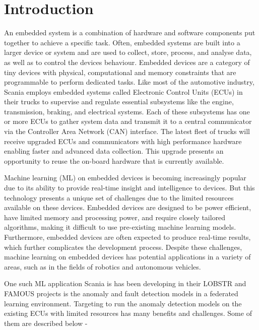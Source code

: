 \part{Introduction}

An embedded system is a combination of hardware and software components put together to achieve a specific task. Often, embedded systems are built into a larger device or system and are used to collect, store, process, and analyse data, as well as to control the device\textquotesingle s behaviour. Embedded devices are a category of tiny devices with physical, computational and memory constraints that are programmable to perform dedicated tasks.   
Like most of the automotive industry, Scania employs embedded systems called Electronic Control Units (ECUs) in their trucks to supervise and regulate essential subsystems like the engine, transmission, braking, and electrical systems. Each of these subsystems has one or more ECUs to gather system data and transmit it to a central communicator via the Controller Area Network (CAN) interface. The latest fleet of trucks will receive upgraded ECUs and communicators with high performance hardware enabling faster and advanced data collection. This upgrade presents an opportunity to reuse the on-board hardware that is currently available.

Machine learning (ML) on embedded devices is becoming increasingly popular due to its ability to provide real-time insight and intelligence to devices. But this technology presents a unique set of challenges due to the limited resources available on these devices. Embedded devices are designed to be power efficient, have limited memory and processing power, and require closely tailored algorithms, making it difficult to use pre-existing machine learning models. Furthermore, embedded devices are often expected to produce real-time results, which further complicates the development process. Despite these challenges, machine learning on embedded devices has potential applications in a variety of areas, such as in the fields of robotics and autonomous vehicles. %

One such ML application Scania is has been developing in their \textsc{LOBSTR} and \textsc{FAMOUS} projects is the anomaly and fault detection models in a federated learning environment. Targeting to run the anomaly detection models on the existing ECUs with limited resources has many benefits and challenges. Some of them are described below - 

